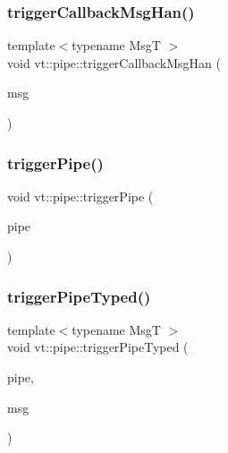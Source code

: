\mbox{\label{namespacevt_1_1pipe_a8be489288c5586b4a4d0daad173bc357}} 
\subsubsection{\texorpdfstring{trigger\+Callback\+Msg\+Han()}{triggerCallbackMsgHan()}}
{\footnotesize\ttfamily template$<$typename MsgT $>$ \\
void vt\+::pipe\+::trigger\+Callback\+Msg\+Han (\begin{DoxyParamCaption}\item[{MsgT $\ast$}]{msg }\end{DoxyParamCaption})}

\mbox{\label{namespacevt_1_1pipe_ac55cd91c8aee610ae0e8b1843229a285}} 
\subsubsection{\texorpdfstring{trigger\+Pipe()}{triggerPipe()}}
{\footnotesize\ttfamily void vt\+::pipe\+::trigger\+Pipe (\begin{DoxyParamCaption}\item[{\hyperlink{namespacevt_ac9852acda74d1896f48f406cd72c7bd3}{Pipe\+Type} const \&}]{pipe }\end{DoxyParamCaption})}

\mbox{\label{namespacevt_1_1pipe_a1fea0e249e8f363c86cff32d9034238e}} 
\subsubsection{\texorpdfstring{trigger\+Pipe\+Typed()}{triggerPipeTyped()}}
{\footnotesize\ttfamily template$<$typename MsgT $>$ \\
void vt\+::pipe\+::trigger\+Pipe\+Typed (\begin{DoxyParamCaption}\item[{\hyperlink{namespacevt_ac9852acda74d1896f48f406cd72c7bd3}{Pipe\+Type} const \&}]{pipe,  }\item[{MsgT $\ast$}]{msg }\end{DoxyParamCaption})}

